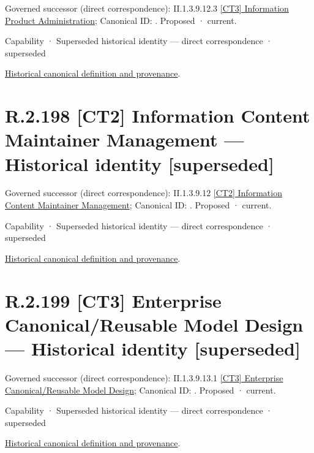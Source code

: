 {\small Governed successor (direct correspondence): II.1.3.9.12.3 \hyperref[element:b5a6a31855834ea58870ebb6c51ed4b0]{[CT3] Information Product Administration}; Canonical ID: \texttt{}. Proposed · current.}\par
\label{element:5d9b7f8d2d7b41759b6d4931c1d2aaa2}
{\small Capability · Superseded historical identity — direct correspondence · superseded}\par
\href{../../../../continuum/strategy/capability/5d9b7f8d2d7b41759b6d4931c1d2aaa2.md}{Historical canonical definition and provenance}.\par
\section*{R.2.198 [CT2] Information Content Maintainer Management — Historical identity [superseded]}
\label{navigation:R.2.198}

{\small Governed successor (direct correspondence): II.1.3.9.12 \hyperref[element:b81a1ab42af24c2e9896b8f3f78d291a]{[CT2] Information Content Maintainer Management}; Canonical ID: \texttt{}. Proposed · current.}\par
\label{element:acb977e879204f1491293e5452e0ddf0}
{\small Capability · Superseded historical identity — direct correspondence · superseded}\par
\href{../../../../continuum/strategy/capability/acb977e879204f1491293e5452e0ddf0.md}{Historical canonical definition and provenance}.\par
\section*{R.2.199 [CT3] Enterprise Canonical/Reusable Model Design — Historical identity [superseded]}
\label{navigation:R.2.199}

{\small Governed successor (direct correspondence): II.1.3.9.13.1 \hyperref[element:90e9cd401ddf4c7690c978d8dd131413]{[CT3] Enterprise Canonical/Reusable Model Design}; Canonical ID: \texttt{}. Proposed · current.}\par
\label{element:dbc37445ad944a85a7c4f26f410967b2}
{\small Capability · Superseded historical identity — direct correspondence · superseded}\par
\href{../../../../continuum/strategy/capability/dbc37445ad944a85a7c4f26f410967b2.md}{Historical canonical definition and provenance}.\par
